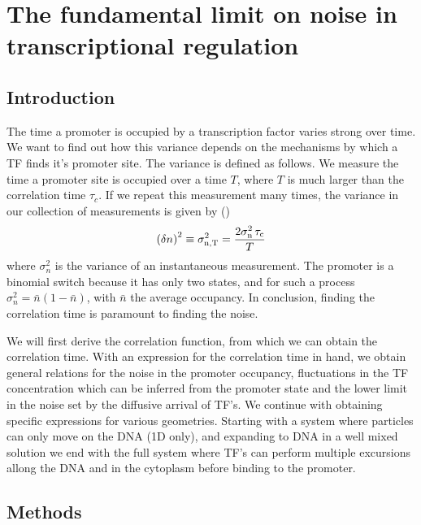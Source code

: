 \section{The fundamental limit on noise in transcriptional regulation}

\subsection{Introduction}
The time a promoter is occupied by a transcription factor varies strong over time. We want to find out how this variance depends on the mechanisms by which a TF finds it's promoter site. The variance is defined as follows. We measure the time a promoter site is occupied over a time $T$, where $T$ is much larger than the correlation time $\tau_c$. If we repeat this measurement many times, the variance in our collection of measurements is given by ()
\begin{equation}
 \left( \delta n \right)^2 \equiv \sigma_{\rm n, T}^2 = \frac{2 \sigma_{\rm n}^2 \,\tau_{\rm c}}{T}
 \elabel{std_devT}
\end{equation}
where $\sigma_n^2$ is the variance of an instantaneous measurement. The promoter is a binomial switch because it has only two states, and for such a process $\sigma^2_n = \bar{n}(1-\bar{n})$, with $\bar{n}$ the average occupancy. In conclusion, finding the correlation time is paramount to finding the noise.

We will first derive the correlation function, from which we can obtain the correlation time. With an expression for the correlation time in hand, we obtain general relations for the noise in the promoter occupancy, fluctuations in the TF concentration which can be inferred from the promoter state and the lower limit in the noise set by the diffusive arrival of TF's. We continue with obtaining specific expressions for various geometries. Starting with a system where particles can only move on the DNA (1D only), and expanding to DNA in a well mixed solution we end with the full system where TF's can perform multiple excursions allong the DNA and in the cytoplasm before binding to the promoter.


\subsection{Methods}

